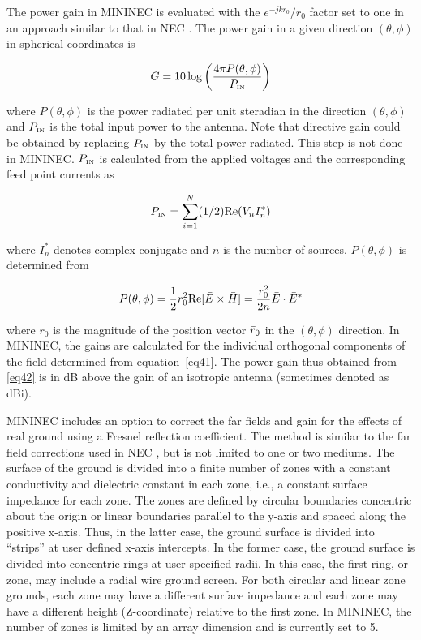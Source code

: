 \documentclass[12pt]{article}
\begin{document}
The power gain in MININEC is evaluated with the $e^{-jkr_0} / r_0$
factor set to one in an approach similar to that in NEC
\cite{r4}. The power gain in a given direction
$(\theta, \phi)$ in spherical coordinates is

\begin{equation}
G = 10 \log\left(\frac{4\pi P(\theta,\phi)}{P_{\mbox{\tiny IN}}}\right)
\label{eq42}
\end{equation}

\noindent where $P(\theta,\phi)$ is the power radiated per unit steradian in the
direction $(\theta, \phi)$ and $P_{\mbox{\tiny IN}}$ is the total input power to the
antenna. Note that directive gain could be obtained by replacing
$P_{\mbox{\tiny IN}}$ by the total power radiated. This step is not done in MININEC.
$P_{\mbox{\tiny IN}}$ is calculated from the applied voltages and the corresponding
feed point currents as

\begin{equation}
P_{\mbox{\tiny IN}} = \sum_{i=1}^{N}(1/2) \mathrm{Re}(V_n I_n^*)
\label{eq43}
\end{equation}

\noindent where $I_n^*$ denotes complex conjugate and $n$ is the number of
sources. $P(\theta,\phi)$ is determined from

\begin{equation}
P(\theta,\phi) = \frac{1}{2} r_0^2 \mathrm{Re}[\bar{E}\times\bar{H}]
= \frac{r_0^2}{2n}\bar{E}\cdot\bar{E}^*
\label{eq44}
\end{equation}

\noindent
where $r_0$ is the magnitude of the position vector $\bar{r}_0$ in the
$(\theta,\phi)$ direction. In MININEC, the gains are calculated for the
individual orthogonal components of the field determined from
equation~\eqref{eq41}. The power gain thus obtained from \eqref{eq42} is
in dB above the gain of an isotropic antenna (sometimes denoted as dBi).

MININEC includes an option to correct the far fields and gain for the
effects of real ground using a Fresnel reflection coefficient. The
method is similar to the far field corrections used in NEC
\cite{r4}, but is not limited to one or two mediums. The
surface of the ground is divided into a finite number of zones with a
constant conductivity and dielectric constant in each zone, i.e., a
constant surface impedance for each zone. The zones are defined by
circular boundaries concentric about the origin or linear boundaries
parallel to the y-axis and spaced along the positive x-axis. Thus, in
the latter case, the ground surface is divided into ``strips'' at user
defined x-axis intercepts. In the former case, the ground surface is
divided into concentric rings at user specified radii. In this case, the
first ring, or zone, may include a radial wire ground screen. For both
circular and linear zone grounds, each zone may have a different surface
impedance and each zone may have a different height (Z-coordinate)
relative to the first zone. In MININEC, the number of zones is limited
by an array dimension and is currently set to 5.
\end{document}
